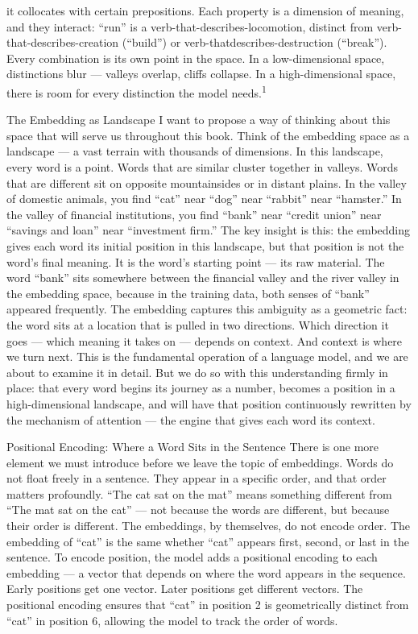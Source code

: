 it collocates with certain prepositions. Each property is a dimension of meaning, and they interact: “run” is a verb-that-describes-locomotion, distinct from verb-that-describes-creation (“build”) or verb-thatdescribes-destruction (“break”). Every combination is its own point in the space. In a low-dimensional space, distinctions blur — valleys overlap, cliffs collapse. In a high-dimensional space, there is room for every distinction the model needs.\textsuperscript{1}

The Embedding as Landscape I want to propose a way of thinking about this space that will serve us throughout this book. Think of the embedding space as a landscape — a vast terrain with thousands of dimensions. In this landscape, every word is a point. Words that are similar cluster together in valleys. Words that are different sit on opposite mountainsides or in distant plains. In the valley of domestic animals, you find “cat” near “dog” near “rabbit” near “hamster.” In the valley of financial institutions, you find “bank” near “credit union” near “savings and loan” near “investment firm.” The key insight is this: the embedding gives each word its initial position in this landscape, but that position is not the word’s final meaning. It is the word’s starting point — its raw material. The word “bank” sits somewhere between the financial valley and the river valley in the embedding space, because in the training data, both senses of “bank” appeared frequently. The embedding captures this ambiguity as a geometric fact: the word sits at a location that is pulled in two directions. Which direction it goes — which meaning it takes on — depends on context. And context is where we turn next. This is the fundamental operation of a language model, and we are about to examine it in detail. But we do so with this understanding firmly in place: that every word begins its journey as a number, becomes a position in a high-dimensional landscape, and will have that position continuously rewritten by the mechanism of attention — the engine that gives each word its context.

Positional Encoding: Where a Word Sits in the Sentence There is one more element we must introduce before we leave the topic of embeddings. Words do not float freely in a sentence. They appear in a specific order, and that order matters profoundly. “The cat sat on the mat” means something different from “The mat sat on the cat” — not because the words are different, but because their order is different. The embeddings, by themselves, do not encode order. The embedding of “cat” is the same whether “cat” appears first, second, or last in the sentence. To encode position, the model adds a positional encoding to each embedding — a vector that depends on where the word appears in the sequence. Early positions get one vector. Later positions get different vectors. The positional encoding ensures that “cat” in position 2 is geometrically distinct from “cat” in position 6, allowing the model to track the order of words.


